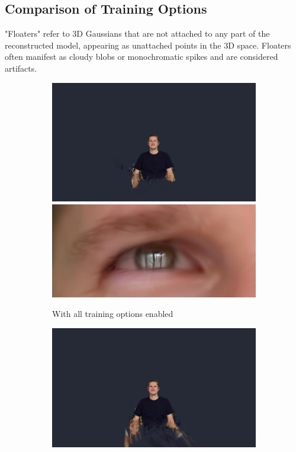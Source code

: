 \subsection{Comparison of Training Options}
"Floaters" refer to 3D Gaussians that are not attached to any part of the reconstructed model, appearing as unattached points in the 3D space. Floaters often manifest as cloudy blobs or monochromatic spikes and are considered artifacts.
\begin{figure}[ht]
	\centering
	\begin{subfigure}{0.48\linewidth}
		\includegraphics[width=\textwidth]{Figures/methods/splatfacto_methods/z_all.png}
		\includegraphics[width=\textwidth]{Figures/methods/splatfacto_methods/eyes_all.png}
		\caption{With all training options enabled}
		\label{fig:3dsplatting-with-all}
	\end{subfigure}
	\begin{subfigure}{0.48\linewidth}
		\includegraphics[width=\textwidth]{Figures/methods/splatfacto_methods/reg_only.png}

\end{subfigure}
\end{figure}
